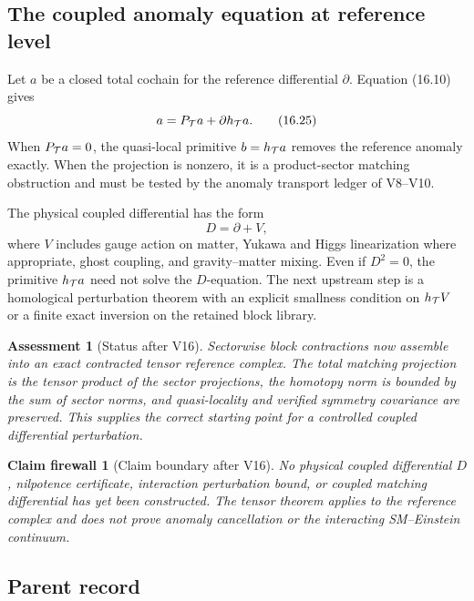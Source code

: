 \documentclass[11pt]{article}
\newtheorem{firewall}[theorem]{Claim firewall}
\newtheorem{assessment}[theorem]{Assessment}
\theoremstyle{remark}
\begin{document}
\subsection{The coupled anomaly equation at reference level}

Let \(a\) be a closed total cochain for the reference differential
\(\partial\).  Equation (16.10) gives
\[
                         a=P_{\cal T}a+
                           \partial h_{\cal T}a.             \tag{16.25}
\]
When \(P_{\cal T}a=0\), the quasi-local primitive
\(b=h_{\cal T}a\) removes the reference anomaly exactly.  When the
projection is nonzero, it is a product-sector matching obstruction
and must be tested by the anomaly transport ledger of V8--V10.

The physical coupled differential has the form
\[
                         D=\partial+V,                      \tag{16.26}
\]
where \(V\) includes gauge action on matter, Yukawa and Higgs
linearization where appropriate, ghost coupling, and
gravity--matter mixing.  Even if \(D^2=0\), the primitive
\(h_{\cal T}a\) need not solve the \(D\)-equation.  The next upstream
step is a homological perturbation theorem with an explicit smallness
condition on \(h_{\cal T}V\) or a finite exact inversion on the
retained block library.

\begin{assessment}[Status after V16]
\label{ass:v12v16-status}
Sectorwise block contractions now assemble into an exact contracted
tensor reference complex.  The total matching projection is the
tensor product of the sector projections, the homotopy norm is
bounded by the sum of sector norms, and quasi-locality and verified
symmetry covariance are preserved.  This supplies the correct
starting point for a controlled coupled differential perturbation.
\end{assessment}

\begin{firewall}[Claim boundary after V16]
\label{fire:v12v16-claim}
No physical coupled differential \(D\), nilpotence certificate,
interaction perturbation bound, or coupled matching differential has
yet been constructed.  The tensor theorem applies to the reference
complex and does not prove anomaly cancellation or the interacting
SM--Einstein continuum.
\end{firewall}

\subsection{Parent record}
\end{document}
